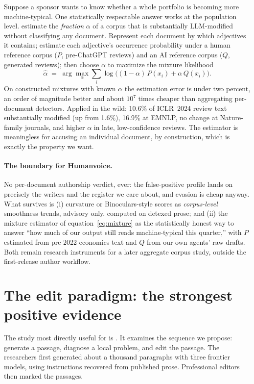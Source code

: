 Suppose a sponsor wants to know whether a whole portfolio is becoming more
machine-typical. One statistically respectable answer works at the population
level. \citet{liang2024monitoring} estimate the \emph{fraction} $\alpha$ of a
corpus that is substantially LLM-modified without classifying any document.
Represent each document by which adjectives it contains; estimate each
adjective's occurrence probability under a human reference corpus ($P$,
pre-ChatGPT reviews) and an AI reference corpus ($Q$, generated reviews);
then choose $\alpha$ to maximize the mixture likelihood
\begin{equation}
\hat{\alpha} \;=\; \arg\max_{\alpha} \sum_{i} \log\bigl((1-\alpha)\,P(x_i) + \alpha\,Q(x_i)\bigr).
\label{eq:mixture}
\end{equation}
On constructed mixtures with known $\alpha$ the estimation error is under
two percent, an order of magnitude better and about $10^{7}$ times cheaper
than aggregating per-document detectors. Applied in the wild: 10.6\% of
ICLR~2024 review text substantially modified (up from 1.6\%), 16.9\% at
EMNLP, no change at Nature-family journals, and higher $\alpha$ in
late, low-confidence reviews. The estimator is meaningless for accusing an
individual document, by construction, which is exactly the property we
want.

\paragraph{The boundary for Humanvoice.} No per-document authorship verdict,
ever: the false-positive profile lands on precisely the writers and the
register we care about, and evasion is cheap anyway. What survives is
(i) curvature or Binoculars-style scores as \emph{corpus-level} smoothness
trends, advisory only, computed on detexed prose; and (ii) the mixture
estimator of equation~\eqref{eq:mixture} as the statistically honest way to
answer ``how much of our output still reads machine-typical this quarter,''
with $P$ estimated from pre-2022 economics text and $Q$ from our own
agents' raw drafts. Both remain research instruments for a later aggregate
corpus study, outside the first-release author workflow.

\section{The edit paradigm: the strongest positive evidence}
\label{sec:lit-editing}

The study most directly useful for \hv{} is
\citet{chakrabarty2024salvage}. It examines the sequence we propose: generate a
passage, diagnose a local problem, and edit the passage. The researchers first
generated about a thousand paragraphs with three frontier models, using
instructions recovered from published prose. Professional editors then marked
the passages.

